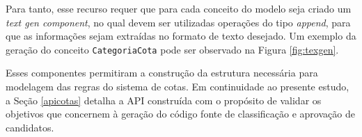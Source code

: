 Para tanto, esse recurso requer que para cada conceito do modelo seja criado um \textit{text gen component}, no qual devem ser utilizadas operações do tipo \textit{append}, para que as informações sejam extraídas no formato de texto desejado. Um exemplo da geração do conceito \texttt{CategoriaCota} pode ser observado na Figura \ref{fig:texgen}.




Esses componentes permitiram a construção da estrutura necessária para modelagem das regras do sistema de cotas. Em continuidade ao presente estudo, a Seção \ref{apicotas} detalha a \gls{API} construída com o propósito de validar os objetivos que concernem à geração do código fonte de classificação e aprovação de candidatos.

\newpage